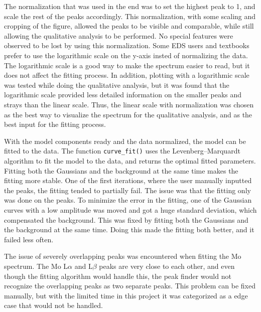 The normalization that was used in the end was to set the highest peak to 1, and scale the rest of the peaks accordingly.
This normalization, with some scaling and cropping of the figure, allowed the peaks to be visible and comparable, while still allowing the qualitative analysis to be performed.
No special features were observed to be lost by using this normalization.
Some EDS users and textbooks prefer to use the logarithmic scale on the y-axis insted of normalizing the data.
The logarithmic scale is a good way to make the spectrum easier to read, but it does not affect the fitting process.
In addition, plotting with a logarithmic scale was tested while doing the qualitative analysis, but it was found that the logarithmic scale provided less detailed information on the smaller peaks and strays than the linear scale.
Thus, the linear scale with normalization was chosen as the best way to visualize the spectrum for the qualitative analysis, and as the best input for the fitting process.


With the model components ready and the data normalized, the model can be fitted to the data.
The function \verb|curve_fit()| uses the Levenberg–Marquardt algorithm to fit the model to the data, and returns the optimal fitted parameters.
Fitting both the Gaussians and the background at the same time makes the fitting more stable.
One of the first iterations, where the user manually inputted the peaks, the fitting tended to partially fail.
The issue was that the fitting only was done on the peaks.
To minimize the error in the fitting, one of the Gaussian curves with a low amplitude was moved and got a huge standard deviation, which compensated the background.
This was fixed by fitting both the Gaussians and the background at the same time.
Doing this made the fitting both better, and it failed less often.

The issue of severely overlapping peaks was encountered when fitting the Mo spectrum.
The Mo L$\alpha$ and L$\beta$ peaks are very close to each other, and even though the fitting algorithm would handle this, the peak finder would not recognize the overlapping peaks as two separate peaks.
This problem can be fixed manually, but with the limited time in this project it was categorized as a edge case that would not be handled.



